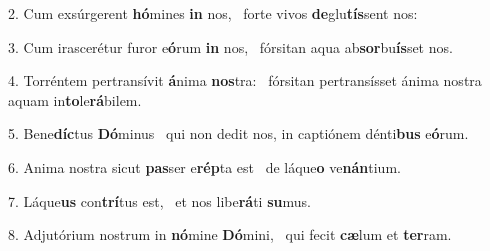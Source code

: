 2. Cum exsúrgerent \textbf{hó}mines \textbf{in} nos, \ast\  forte vivos \textbf{de}glu\textbf{tís}sent nos:\

3. Cum irascerétur furor e\textbf{ó}rum \textbf{in} nos, \ast\  fórsitan aqua ab\textbf{sor}bu\textbf{ís}set nos.\

4. Torréntem pertransívit \textbf{á}nima \textbf{nos}tra: \ast\  fórsitan pertransísset ánima nostra aquam in\textbf{to}le\textbf{rá}bilem.\

5. Bene\textbf{díc}tus \textbf{Dó}minus \ast\  qui non dedit nos, in captiónem dénti\textbf{bus} e\textbf{ó}rum.\

6. Anima nostra sicut \textbf{pas}ser e\textbf{rép}ta est \ast\  de láque\textbf{o} ve\textbf{nán}tium.\

7. Láque\textbf{us} con\textbf{trí}tus est, \ast\  et nos libe\textbf{rá}ti \textbf{su}mus.\

8. Adjutórium nostrum in \textbf{nó}mine \textbf{Dó}mini, \ast\  qui fecit \textbf{cæ}lum et \textbf{ter}ram.\

